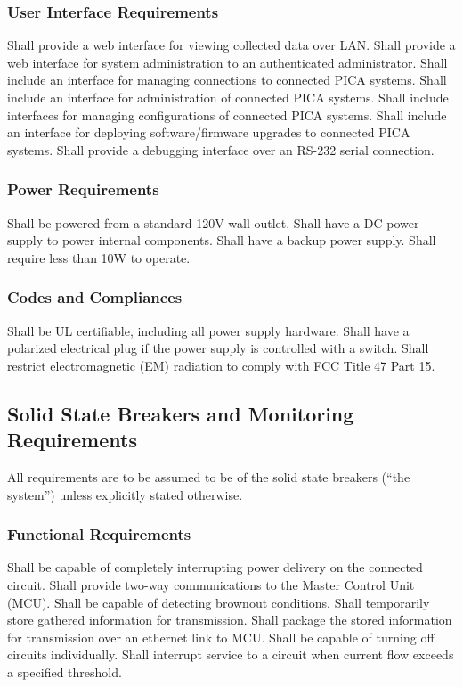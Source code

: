\subsubsection{User Interface Requirements}
\begin{outline}[enumerate]
\1 Shall provide a web interface for viewing collected data over LAN.
\1 Shall provide a web interface for system administration to an authenticated administrator.
\2 Shall include an interface for managing connections to connected PICA systems.
\2 Shall include an interface for administration of connected PICA systems.
\3 Shall include interfaces for managing configurations of connected PICA systems.
\3 Shall include an interface for deploying software/firmware upgrades to connected PICA systems.
\1 Shall provide a debugging interface over an RS-232 serial connection.
\end{outline}

\subsubsection{Power Requirements}
\begin{outline}[enumerate]
\1 Shall be powered from a standard 120V wall outlet.
\1 Shall have a DC power supply to power internal components.
\1 Shall have a backup power supply.
\1 Shall require less than 10W to operate.
\end{outline}

\subsubsection{Codes and Compliances}
\begin{outline}[enumerate]
\1 Shall be UL certifiable, including all power supply hardware.
\1 Shall have a polarized electrical plug if the power supply is controlled with a switch.
\1 Shall restrict electromagnetic (EM) radiation to comply with FCC Title 47 Part 15.
\end{outline}

\subsection{Solid State Breakers and Monitoring Requirements}
All requirements are to be assumed to be of the solid state breakers (``the system'') unless explicitly stated otherwise.

\subsubsection{Functional Requirements}
\begin{outline}[enumerate]
\1 Shall be capable of completely interrupting power delivery on the connected  circuit. 
\1 Shall provide two-way communications to the Master Control Unit (MCU).
\1 Shall be capable of detecting brownout conditions.
\1 Shall temporarily store gathered information for transmission.
\1 Shall package the stored information for transmission over an ethernet link to MCU.
\1 Shall be capable of turning off circuits individually.
\1 Shall interrupt service to a circuit when current flow exceeds a specified threshold.
\end{outline}

